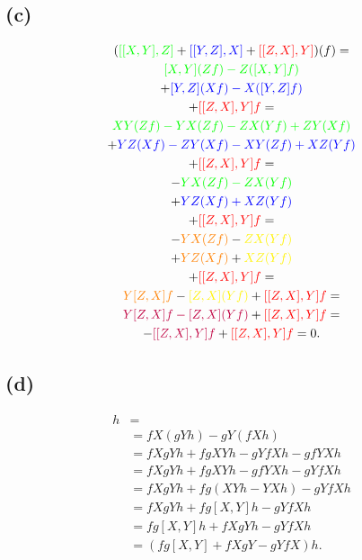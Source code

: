 \documentclass{article}
\begin{document}
\subsection*{(c)}
\begin{multline*}
(\textcolor{green}{[[X,Y],Z]} +\textcolor{blue}{[[Y,Z],X]} +\textcolor{red}{[[Z,X],Y]})(f)=\\
	\textcolor{green}{[X,Y](Zf)-Z([X,Y]f)}\\
	+\textcolor{blue}{[Y,Z](Xf)-X([Y,Z]f)}\\
	+\textcolor{red}{[[Z,X],Y]f}=\\
\textcolor{green}{XY(Zf)-YX(Zf)-ZX(Yf)+ZY(Xf)}\\
+\textcolor{blue}{YZ(Xf)-ZY(Xf)-XY(Zf)+XZ(Yf)}\\
+\textcolor{red}{[[Z,X],Y]f}=\\
-\textcolor{green}{YX(Zf)-ZX(Yf)}\\
+\textcolor{blue}{YZ(Xf)+XZ(Yf)}\\
+\textcolor{red}{[[Z,X],Y]f}=\\
-\textcolor{orange}{YX(Zf)}-\textcolor{yellow}{ZX(Yf)}\\
+\textcolor{orange}{YZ(Xf)}+\textcolor{yellow}{XZ(Yf)}\\
+\textcolor{red}{[[Z,X],Y]f}=\\
\textcolor{orange}{Y[Z,X]f}-\textcolor{yellow}{[Z,X](Yf)}+\textcolor{red}{[[Z,X],Y]f}=\\
\textcolor{purple}{Y[Z,X]f-[Z,X](Yf)}+\textcolor{red}{[[Z,X],Y]f}=\\
-\textcolor{purple}{[[Z,X],Y]f}+\textcolor{red}{[[Z,X],Y]f}=0.
\end{multline*}

\subsection*{(d)}
\begin{align*}
[fX,gY]h
&=\\
&=fX(gYh)-gY(fXh)\\
&=fXgYh+fgXYh-gYfXh-gfYXh\\
&=fXgYh+fgXYh-gfYXh-gYfXh\\
&=fXgYh+fg(XYh-YXh)-gYfXh\\
&=fXgYh+fg[X,Y]h-gYfXh\\
&=fg[X,Y]h+fXgYh-gYfXh\\
&=(fg[X,Y]+fXgY-gYfX)h.
\end{align*}
\end{document}
